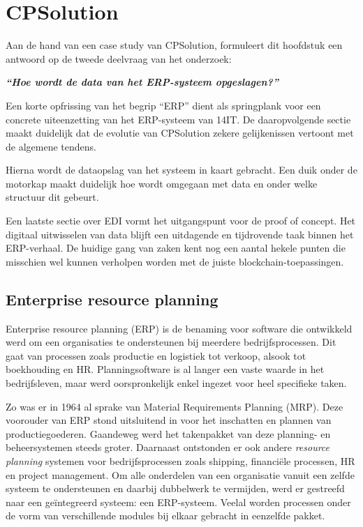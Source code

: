 \chapter{CPSolution}
\label{ch:cpsolution}

Aan de hand van een case study van CPSolution, formuleert dit hoofdstuk een antwoord op de tweede deelvraag van het onderzoek:

\begin{center}
	\textit{\textbf{``Hoe wordt de data van het ERP-systeem opgeslagen?''}}
\end{center}

Een korte opfrissing van het begrip ``ERP'' dient als springplank voor een concrete uiteenzetting van het ERP-systeem van 14IT. De daaropvolgende sectie maakt duidelijk dat de evolutie van CPSolution zekere gelijkenissen vertoont met de algemene tendens. 

Hierna wordt de dataopslag van het systeem in kaart gebracht. Een duik onder de motorkap maakt duidelijk hoe wordt omgegaan met data en onder welke structuur dit gebeurt. 

Een laatste sectie over EDI vormt het uitgangspunt voor de proof of concept. Het digitaal uitwisselen van data blijft een uitdagende en tijdrovende taak binnen het ERP-verhaal. De huidige gang van zaken kent nog een aantal hekele punten die misschien wel kunnen verholpen worden met de juiste blockchain-toepassingen.


\section{Enterprise resource planning}
\label{sec:enterprise-resource-planning}

Enterprise resource planning (ERP) is de benaming voor software die ontwikkeld werd om een organisaties te ondersteunen bij meerdere bedrijfsprocessen. Dit gaat van processen zoals productie en logistiek tot verkoop, alsook tot boekhouding en HR. Planningsoftware is al langer een vaste waarde in het bedrijfsleven, maar werd oorspronkelijk enkel ingezet voor heel specifieke taken. 

Zo was er in 1964 al sprake van Material Requirements Planning (MRP). Deze voorouder van ERP stond uitsluitend in voor het inschatten en plannen van productiegoederen. Gaandeweg werd het takenpakket van deze planning- en beheersystemen steeds groter. Daarnaast ontstonden er ook andere \textit{resource planning} systemen voor bedrijfsprocessen zoals shipping, financiële processen, HR en project management. Om alle onderdelen van een organisatie vanuit een zelfde systeem te ondersteunen en daarbij dubbelwerk te vermijden, werd er gestreefd naar een geïntegreerd systeem: een ERP-systeem. Veelal worden processen onder de vorm van verschillende modules bij elkaar gebracht in eenzelfde pakket.

